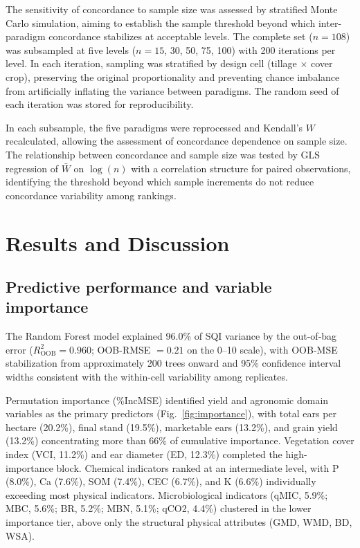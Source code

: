 \documentclass[pdflatex,sn-basic]{sn-jnl}%
\begin{document}
The sensitivity of concordance to sample size was assessed by stratified Monte Carlo simulation, aiming to establish the sample threshold beyond which inter-paradigm concordance stabilizes at acceptable levels. The complete set ($n = 108$) was subsampled at five levels ($n = 15$, 30, 50, 75, 100) with 200 iterations per level. In each iteration, sampling was stratified by design cell (tillage $\times$ cover crop), preserving the original proportionality and preventing chance imbalance from artificially inflating the variance between paradigms. The random seed of each iteration was stored for reproducibility.

In each subsample, the five paradigms were reprocessed and Kendall's $W$ recalculated, allowing the assessment of concordance dependence on sample size. The relationship between concordance and sample size was tested by GLS regression of $\bar{W}$ on $\log(n)$ with a correlation structure for paired observations, identifying the threshold beyond which sample increments do not reduce concordance variability among rankings.

\section{Results and Discussion}\label{sec:results_discussion}

\subsection{Predictive performance and variable importance}\label{subsec:performance}

The Random Forest model explained 96.0\% of SQI variance by the out-of-bag error ($R^2_{\text{OOB}} = 0.960$; OOB-RMSE $= 0.21$ on the 0--10 scale), with OOB-MSE stabilization from approximately 200 trees onward and 95\% confidence interval widths consistent with the within-cell variability among replicates.

Permutation importance (\%IncMSE) identified yield and agronomic domain variables as the primary predictors (Fig.~\ref{fig:importance}), with total ears per hectare (20.2\%), final stand (19.5\%), marketable ears (13.2\%), and grain yield (13.2\%) concentrating more than 66\% of cumulative importance. Vegetation cover index (VCI, 11.2\%) and ear diameter (ED, 12.3\%) completed the high-importance block. Chemical indicators ranked at an intermediate level, with P (8.0\%), Ca (7.6\%), SOM (7.4\%), CEC (6.7\%), and K (6.6\%) individually exceeding most physical indicators. Microbiological indicators (qMIC, 5.9\%; MBC, 5.6\%; BR, 5.2\%; MBN, 5.1\%; qCO2, 4.4\%) clustered in the lower importance tier, above only the structural physical attributes (GMD, WMD, BD, WSA).
\end{document}
